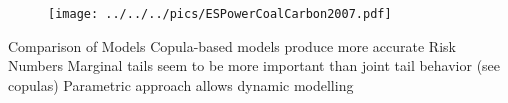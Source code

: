 	\begin{figure}
	\begin{center}
	\texttt{[image: ../../../pics/ESPowerCoalCarbon2007.pdf]}
	\end{center}
	\end{figure}


Comparison of Models
	Copula-based models produce more accurate Risk Numbers
	Marginal tails seem to be more important than joint tail behavior (see copulas)
	Parametric approach allows dynamic modelling


